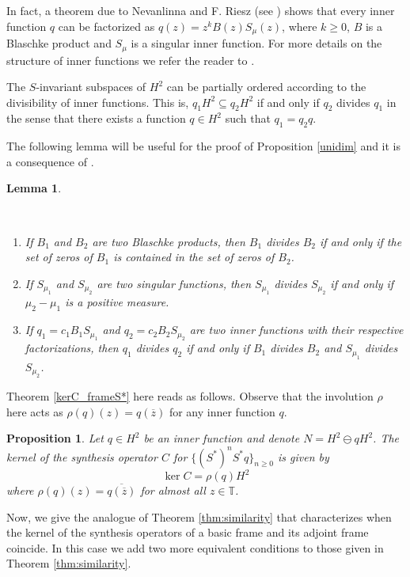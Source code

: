 \documentclass[a4paper,12pt]{amsart}
\def\T{{\mathbb{T}}}
\newtheorem{lemma}[theorem]{Lemma}
\newtheorem{proposition}[theorem]{Proposition}
\theoremstyle{definition}
\begin{document}
In fact, a theorem due to Nevanlinna and F. Riesz (see \cite[Theorem 2.14]{GMR}) shows that every inner function $q$ can be factorized as $q(z)= z^{k} B(z) S_{\mu}(z)$, where $k\geqslant 0$, $B$ is a Blaschke product and $S_{\mu}$ is a singular inner function. For more details on the structure of inner functions we refer the reader to \cite[Section 2.3]{GMR}.


The $S$-invariant subspaces of $H^2$ can be partially ordered according to the di\-vi\-si\-bi\-li\-ty of inner functions. This is, $q_{1} H^2\subseteq q_2H^2$ if and only if $q_2$ divides $q_{1}$ in the sense that there exists a function $q\in H^2$ such that $q_1 = q_2 q$.

The following lemma will be useful for the proof of Proposition \ref{unidim} and it is a consequence of \cite[Proposition 4.10]{GMR}.
\begin{lemma}\label{blaschke_sing}

\

\begin{enumerate}[label=(\roman*),ref=(\roman*)]

\item If $B_{1}$ and $B_2$ are two Blaschke products, then $B_{1}$ divides $B_2$ if and only if the set of zeros of $B_{1}$ is contained in the set of zeros of $B_2$.

\item If $S_{\mu_1}$ and $S_{\mu_2}$ are two singular functions, then $S_{\mu_1}$ divides $S_{\mu_2}$ if and only if $\mu_2 -\mu_1$ is a positive measure.

\item If $q_{1} = c_{1} B_{1} S_{\mu_1}$ and $q_2 = c_2 B_2 S_{\mu_2}$ are two inner functions with their respective factorizations, then $q_1$ divides $q_2$ if and only if $B_1$ divides $B_2$ and $S_{\mu_1}$ divides $S_{\mu_2}$.
\end{enumerate}
\end{lemma}

Theorem \ref{kerC_frameS*} here reads as follows. Observe that the involution $\rho$ here acts as $\rho(q)(z)=q(\overline{z})$ for any inner function $q$.

\begin{proposition}
Let $q\in H^2$ be an inner function and denote $N=H^2\ominus qH^2$. The kernel of the synthesis operator $C$ for $\{(S^*)^nS^*q\}_{n\geqslant 0}$ is given by
\begin{equation*}
\ker C=\rho(q)H^2
\end{equation*}
where $\rho(q)(z)=\overline{q(\overline{z})}$ for almost all $z\in\T$.
\end{proposition}
Now, we give the analogue of Theorem \ref{thm:similarity} that characterizes when the kernel of the synthesis operators of a basic frame and its adjoint frame coincide. In this case we add two more equivalent conditions to those given in Theorem \ref{thm:similarity}. 
\end{document}
